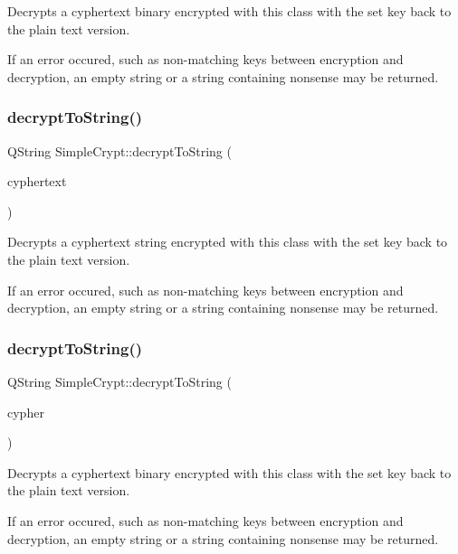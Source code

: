 Decrypts a cyphertext binary encrypted with this class with the set key back to the plain text version.

If an error occured, such as non-\/matching keys between encryption and decryption, an empty string or a string containing nonsense may be returned. \mbox{\label{class_simple_crypt_aa454cf372b534fd5ffaa2c5bd0fa57ea}} 
\subsubsection{\texorpdfstring{decryptToString()}{decryptToString()}\hspace{0.1cm}{\footnotesize\ttfamily [1/2]}}
{\footnotesize\ttfamily Q\+String Simple\+Crypt\+::decrypt\+To\+String (\begin{DoxyParamCaption}\item[{const Q\+String \&}]{cyphertext }\end{DoxyParamCaption})}

Decrypts a cyphertext string encrypted with this class with the set key back to the plain text version.

If an error occured, such as non-\/matching keys between encryption and decryption, an empty string or a string containing nonsense may be returned. \mbox{\label{class_simple_crypt_ad1a3257cefee43773803ec1b12654f92}} 
\subsubsection{\texorpdfstring{decryptToString()}{decryptToString()}\hspace{0.1cm}{\footnotesize\ttfamily [2/2]}}
{\footnotesize\ttfamily Q\+String Simple\+Crypt\+::decrypt\+To\+String (\begin{DoxyParamCaption}\item[{Q\+Byte\+Array}]{cypher }\end{DoxyParamCaption})}

Decrypts a cyphertext binary encrypted with this class with the set key back to the plain text version.

If an error occured, such as non-\/matching keys between encryption and decryption, an empty string or a string containing nonsense may be returned. \mbox{\label{class_simple_crypt_ae1991c7748b2bb74468bee0be372d2c4}} 
